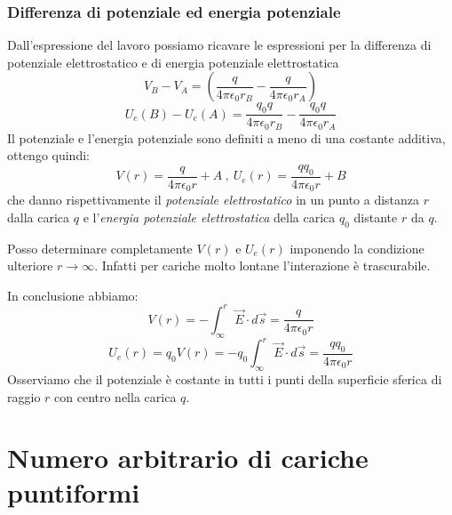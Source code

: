 \documentclass[class=book, crop=false, oneside, 12pt]{standalone}
\begin{document}
\subsubsection*{Differenza di potenziale ed energia potenziale}

Dall'espressione del lavoro possiamo ricavare le espressioni per la differenza di potenziale elettrostatico e di energia potenziale elettrostatica
\begin{equation}
    V_B - V_A = \left(\frac{q}{4 \pi \epsilon_0 r_B} - \frac{q}{4 \pi \epsilon_0 r_A}\right)
\end{equation}
\begin{equation}
    U_e(B) - U_e(A) = \frac{q_0 q}{4 \pi \epsilon_0 r_B} - \frac{q_0 q}{4 \pi \epsilon_0 r_A}
\end{equation}
Il potenziale e l'energia potenziale sono definiti a meno di una costante additiva, ottengo quindi:
\begin{equation*}
    V(r) = \frac{q}{4 \pi \epsilon_0 r} + A \ , \ U_e(r) = \frac{q q_0}{4 \pi \epsilon_0 r} + B 
\end{equation*}
che danno rispettivamente il \emph{potenziale elettrostatico} in un punto a distanza \(r\) dalla carica \(q\) e l'\emph{energia potenziale elettrostatica} della carica \(q_0\) distante \(r\) da \(q\). 

Posso determinare completamente \(V(r)\) e \(U_e(r)\) imponendo la condizione ulteriore \(r \rightarrow \infty\).  
Infatti per cariche molto lontane l'interazione è trascurabile.

In conclusione abbiamo:
\begin{equation}
    V(r) = -\int_{\infty}^r \overrightarrow{E} \cdot d \overrightarrow{s} = \frac{q}{4 \pi \epsilon_0 r}
\end{equation}
\begin{equation}
    U_e(r) = q_0 V(r) = -q_0 \int_{\infty}^r \overrightarrow{E} \cdot d \overrightarrow{s} =\frac{q q_0}{4 \pi \epsilon_0 r}
\end{equation}
Osserviamo che il potenziale è costante in tutti i punti della superficie sferica di raggio \(r\) con centro nella carica \(q\).

\section{Numero arbitrario di cariche puntiformi}
\end{document}
